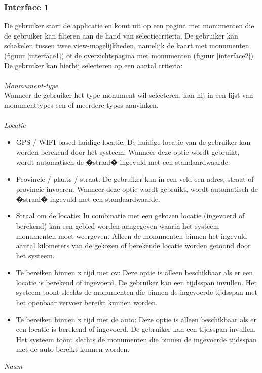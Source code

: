 \documentclass[a4paper,10pt]{article}
\begin{document}
			\subsubsection{Interface 1}
			De gebruiker start de applicatie en komt uit op een pagina met monumenten die de gebruiker kan filteren aan de hand van selectiecriteria. De gebruiker kan schakelen tussen twee view-mogelijkheden, namelijk de kaart met monumenten (figuur \ref{interface1}) of de overzichtspagina met monumenten (figuur \ref{interface2}). De gebruiker kan hierbij selecteren op een aantal criteria:\\
			\\
			\textit{Monmument-type}\\
			Wanneer de gebruiker het type monument wil selecteren, kan hij in een lijst van monumenttypes een of meerdere types aanvinken.\\
			\\
			\textit{Locatie}
			\begin{itemize}
				\item GPS / WIFI based huidige locatie: De huidige locatie van de gebruiker kan worden berekend door het systeem. Wanneer deze optie wordt gebruikt, wordt automatisch de �straal� ingevuld met een standaardwaarde. 
				\item Provincie / plaats / straat: De gebruiker kan in een veld een adres, straat of provincie invoeren. Wanneer deze optie wordt gebruikt, wordt automatisch de �straal� ingevuld met een standaardwaarde.
				\item Straal om de locatie: In combinatie met een gekozen locatie (ingevoerd of berekend) kan een gebied worden aangegeven waarin het systeem monumenten moet weergeven. Alleen de monumenten binnen het ingevuld aantal kilometers van de gekozen of berekende locatie worden getoond door het systeem.
				\item Te bereiken binnen x tijd met ov: Deze optie is alleen beschikbaar als er een locatie is berekend of ingevoerd. De gebruiker kan een tijdsspan invullen. Het systeem toont slechts de monumenten die binnen de ingevoerde tijdsspan met het openbaar vervoer bereikt kunnen worden.
				\item Te bereiken binnen x tijd met de auto: Deze optie is alleen beschikbaar als er een locatie is berekend of ingevoerd. De gebruiker kan een tijdsspan invullen. Het systeem toont slechts de monumenten die binnen de ingevoerde tijdsspan met de auto bereikt kunnen worden.
			\end{itemize}
			\textit{Naam}\\
\end{document}
